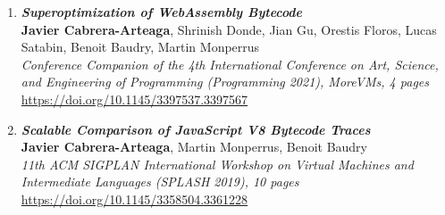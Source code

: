 \begin{enumerate}[I]
	\item \textbf{\textit{Superoptimization of WebAssembly Bytecode}} \\
    \textbf{Javier Cabrera-Arteaga}, Shrinish Donde, Jian Gu, Orestis Floros, Lucas Satabin, Benoit Baudry, Martin Monperrus\\
    \textit{Conference Companion of the 4th International Conference on Art, Science, and Engineering of Programming (Programming 2021), MoreVMs, 4 pages} \\
    \url{https://doi.org/10.1145/3397537.3397567}
    \item \textbf{\textit{Scalable Comparison of JavaScript V8 Bytecode Traces}} \\
        \textbf{Javier Cabrera-Arteaga}, Martin Monperrus, Benoit Baudry\\
        \textit{11th ACM SIGPLAN International Workshop on Virtual Machines and Intermediate Languages (SPLASH 2019), 10 pages} \\
        \url{https://doi.org/10.1145/3358504.3361228}
\end{enumerate}


